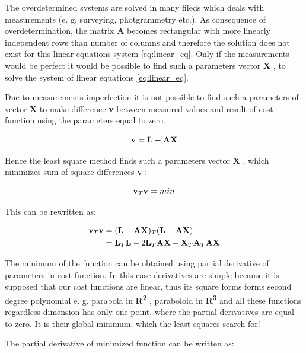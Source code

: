 \documentclass[a4paper,12pt]{report}
\newcommand{\ematr}[1]{
{\bf #1}
}
\newcommand{\evect}[1]{
{\bf #1}
}
\newcommand{\eucl}[1]{
{\bf R\textsuperscript{#1}}
}
\begin{document}
The overdetermined systems are solved in many fileds which deals with measurements (e. g. 
surveying, photgrammetry etc.).
As consequence of overdetermination, the matrix \ematr{A} becomes rectangular with more linearly independent rows than  number of columns 
and therefore the solution does not exist for this linear equations system \eqref{eq:linear_eq}.
Only if the measurements would be perfect it would be possible to find such a parameters vector \evect{X}, to 
solve the system of linear equations \eqref{eq:linear_eq}. 

Due to measurements imperfection it is not possible to find such a parameters of vector \evect{X} to make difference \evect{v} between measured values and 
result of cost function using the parameters equal to zero. 

\begin{equation}
\label{eq:least_v}
\evect{v} = \evect{L} - \ematr{A}\evect{X}
\end{equation} 


Hence the least square method finds such a parameters vector \evect{X}, which minimizes 
sum of square differences \evect{v}: 

\begin{equation}
\evect{v}_{T} \evect{v} = min
\end{equation} 


This can be rewritten as:

\begin{equation}
\begin{split}
\evect{v}_{T} \evect{v} &= (\evect{L} - \ematr{A}\ematr{X})_{T} (\evect{L} - \ematr{A}\ematr{X}) \\
&= \evect{L}_{T} \evect{L} - 2 \evect{L}_{T} \ematr{A} \evect{X} + \evect{X}_{T} \ematr{A}_{T} \ematr{A} \evect{X}
\label{eq:least_be_part}
\end{split}
\end{equation} 

The minimum of the function can be obtained using partial derivative of parameters in cost function.
In this case derivatives are simple because it is supposed that our cost functions are linear, thus 
its square forms forms  second degree polynomial e. g. parabola in \eucl{2}, paraboloid in \eucl{3} and all these functions 
regardless dimension has only one point, where the partial derivatives are equal to zero. It is 
their global minimum, which the least squares search for!

The partial derivative of minimized function can be written as:
 
\end{document}

